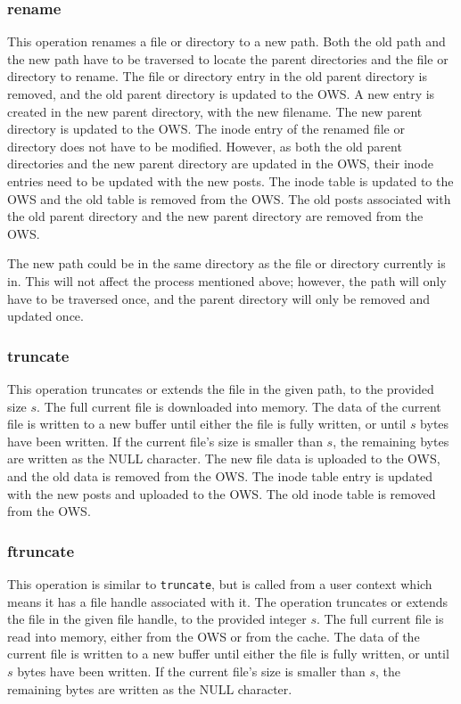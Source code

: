 \subsubsection{rename}
This operation renames a file or directory to a new path. Both the old path and the new path have to be traversed to locate the parent directories and the file or directory to rename. The file or directory entry in the old parent directory is removed, and the old parent directory is updated to the \gls{OWS}. A new entry is created in the new parent directory, with the new filename. The new parent directory is updated to the \gls{OWS}. The inode entry of the renamed file or directory does not have to be modified. However, as both the old parent directories and the new parent directory are updated in the \gls{OWS}, their inode entries need to be updated with the new posts. The inode table is updated to the \gls{OWS} and the old table is removed from the \gls{OWS}. The old posts associated with the old parent directory and the new parent directory are removed from the \gls{OWS}.

The new path could be in the same directory as the file or directory currently is in. This will not affect the process mentioned above; however, the path will only have to be traversed once, and the parent directory will only be removed and updated once.

\subsubsection{truncate}
This operation truncates or extends the file in the given path, to the provided size $s$. The full current file is downloaded into memory. The data of the current file is written to a new buffer until either the file is fully written, or until $s$ bytes have been written. If the current file's size is smaller than $s$, the remaining bytes are written as the NULL character. The new file data is uploaded to the \gls{OWS}, and the old data is removed from the \gls{OWS}. The inode table entry is updated with the new posts and uploaded to the \gls{OWS}. The old inode table is removed from the \gls{OWS}.

\subsubsection{ftruncate}
This operation is similar to \texttt{truncate}, but is called from a user context which means it has a file handle associated with it. The operation truncates or extends the file in the given file handle, to the provided integer $s$. The full current file is read into memory, either from the \gls{OWS} or from the cache. The data of the current file is written to a new buffer until either the file is fully written, or until $s$ bytes have been written. If the current file's size is smaller than $s$, the remaining bytes are written as the NULL character.

